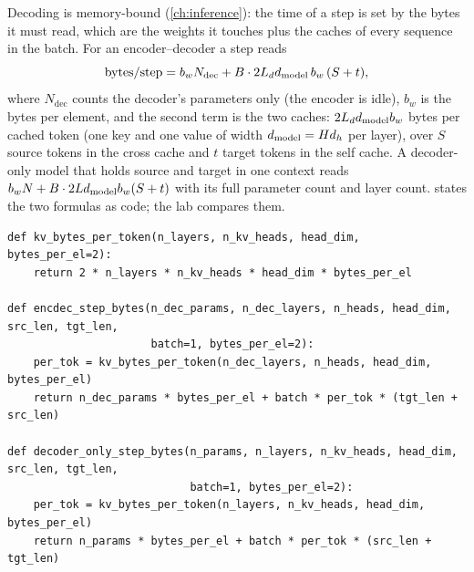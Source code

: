 Decoding is memory-bound (\cref{ch:inference}): the time of a step is set by the bytes it must read,
which are the weights it touches plus the caches of every sequence in the batch. For an
encoder--decoder a step reads
\begin{equation}
\text{bytes/step} = b_w N_\text{dec} + B\cdot 2L_dd_{\text{model}}\, b_w\,(S + t),
\label{eq:encoders:stepbytes}
\end{equation}
where $N_\text{dec}$ counts the decoder's parameters only (the encoder is idle), $b_w$ is the bytes
per element, and the second term is the two caches: $2L_dd_{\text{model}} b_w$ bytes per cached token (one key
and one value of width $d_{\text{model}}=Hd_{h}$ per layer), over $S$ source tokens in the cross cache and
$t$ target tokens in the self cache. A decoder-only model that holds source and target in one context
reads $b_w N + B\cdot2Ld_{\text{model}} b_w(S+t)$ with its full parameter count and layer count.
 states the two formulas as code; the lab compares them.

\begin{lstlisting}[caption={Bytes per decoding step (from \ident{llmsys/encdec.py}).},label={lst:encoders:stepbytes}]
def kv_bytes_per_token(n_layers, n_kv_heads, head_dim, bytes_per_el=2):
    return 2 * n_layers * n_kv_heads * head_dim * bytes_per_el

def encdec_step_bytes(n_dec_params, n_dec_layers, n_heads, head_dim, src_len, tgt_len,
                      batch=1, bytes_per_el=2):
    per_tok = kv_bytes_per_token(n_dec_layers, n_heads, head_dim, bytes_per_el)
    return n_dec_params * bytes_per_el + batch * per_tok * (tgt_len + src_len)

def decoder_only_step_bytes(n_params, n_layers, n_kv_heads, head_dim, src_len, tgt_len,
                            batch=1, bytes_per_el=2):
    per_tok = kv_bytes_per_token(n_layers, n_kv_heads, head_dim, bytes_per_el)
    return n_params * bytes_per_el + batch * per_tok * (src_len + tgt_len)
\end{lstlisting}


